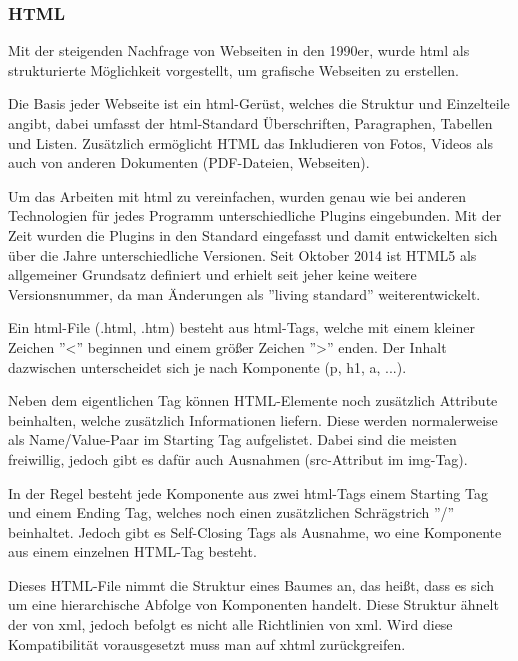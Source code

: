 \subsubsection{HTML}

Mit der steigenden Nachfrage von Webseiten in den 1990er, wurde \gls{html} als strukturierte Möglichkeit vorgestellt, um grafische Webseiten zu erstellen.

Die Basis jeder Webseite ist ein \gls{html}-Gerüst, welches die Struktur und Einzelteile angibt, dabei umfasst der \gls{html}-Standard Überschriften, Paragraphen, Tabellen und Listen. Zusätzlich ermöglicht HTML das Inkludieren von Fotos, Videos als auch von anderen Dokumenten (PDF-Dateien, Webseiten). \cite{HTML-CSS}

Um das Arbeiten mit \gls{html} zu vereinfachen, wurden genau wie bei anderen Technologien für jedes Programm unterschiedliche Plugins eingebunden. Mit der Zeit wurden die Plugins in den Standard eingefasst und damit entwickelten sich über die Jahre unterschiedliche Versionen. Seit Oktober 2014 ist HTML5 als allgemeiner Grundsatz definiert und erhielt seit jeher keine weitere Versionsnummer, da man Änderungen als ''living standard'' weiterentwickelt. \cite{HTML5}

Ein \gls{html}-File (.html, .htm) besteht aus \gls{html}-Tags, welche mit einem kleiner Zeichen ''<'' beginnen und einem größer Zeichen ''>'' enden. Der Inhalt dazwischen unterscheidet sich je nach Komponente (p, h1, a, ...).

Neben dem eigentlichen Tag können HTML-Elemente noch zusätzlich Attribute beinhalten, welche zusätzlich Informationen liefern. Diese werden normalerweise als Name/Value-Paar im Starting Tag aufgelistet. Dabei sind die meisten freiwillig, jedoch gibt es dafür auch Ausnahmen (src-Attribut im img-Tag). \cite{HTML-ATT1, HTML-ATT2}

In der Regel besteht jede Komponente aus zwei \gls{html}-Tags einem Starting Tag und einem Ending Tag, welches noch einen zusätzlichen Schrägstrich ''/'' beinhaltet. Jedoch gibt es Self-Closing Tags als Ausnahme, wo eine Komponente aus einem einzelnen HTML-Tag besteht.

Dieses HTML-File nimmt die Struktur eines Baumes an, das heißt, dass es sich um eine hierarchische Abfolge von Komponenten handelt. Diese Struktur ähnelt der von \gls{xml}, jedoch befolgt es nicht alle Richtlinien von \gls{xml}. Wird diese Kompatibilität vorausgesetzt muss man auf \gls{xhtml} zurückgreifen. \cite{HTML-CSS}

